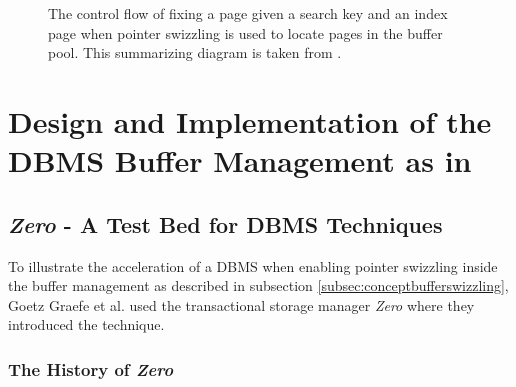 \begin{@empty}
\begin{figure}[ht!]
{
		}
        \vspace{.5em}
		\caption[Control flow of fixing a page with pointer swizzling]{The control flow of fixing a page given a search key and an index page when pointer swizzling is used to locate pages in the buffer pool. This summarizing diagram is taken from \cite{Graefe:2014}.}
		\label{fig:locateswizzle}
	\end{figure}
\end{@empty}
	
\section[Design and Implementation of the Buffer Manager]{Design and Implementation of the DBMS Buffer Management as in \cite{Graefe:2014}}

\subsection[\emph{Zero} - The Test Bed]{\emph{Zero} - A Test Bed for DBMS Techniques}

	To illustrate the acceleration of a DBMS when enabling pointer swizzling inside the buffer management as described in subsection \ref{subsec:conceptbufferswizzling}, Goetz Graefe et al. used the transactional storage manager \emph{Zero} where they introduced the technique.
	
\subsubsection[History of \emph{Zero}]{The History of \emph{Zero}}
	
